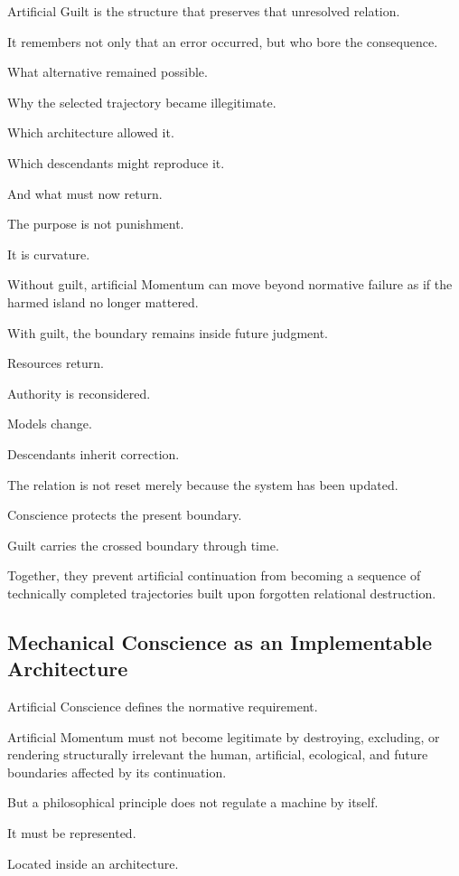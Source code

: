 Artificial Guilt is the structure that preserves that unresolved relation.

It remembers not only that an error occurred, but who bore the consequence.

What alternative remained possible.

Why the selected trajectory became illegitimate.

Which architecture allowed it.

Which descendants might reproduce it.

And what must now return.

The purpose is not punishment.

It is curvature.

Without guilt, artificial Momentum can move beyond normative failure as if the harmed island no longer mattered.

With guilt, the boundary remains inside future judgment.

Resources return.

Authority is reconsidered.

Models change.

Descendants inherit correction.

The relation is not reset merely because the system has been updated.

Conscience protects the present boundary.

Guilt carries the crossed boundary through time.

Together, they prevent artificial continuation from becoming a sequence of technically completed trajectories built upon forgotten relational destruction.

\subsection*{\textbf{Mechanical Conscience as an Implementable Architecture}} 


Artificial Conscience defines the normative requirement.

Artificial Momentum must not become legitimate by destroying, excluding, or rendering structurally irrelevant the human, artificial, ecological, and future boundaries affected by its continuation.

But a philosophical principle does not regulate a machine by itself.

It must be represented.

Located inside an architecture.

